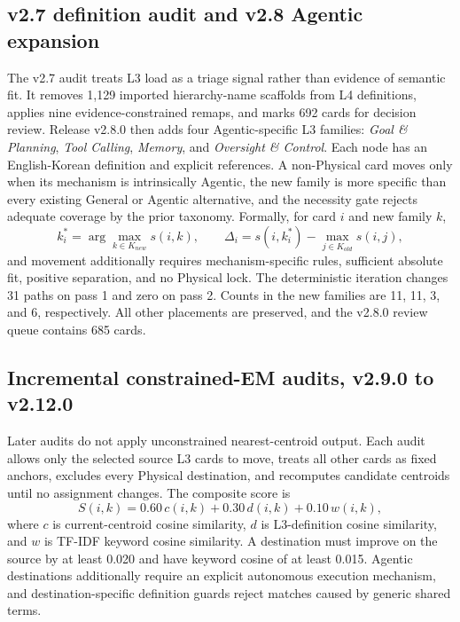 \documentclass[11pt,a4paper]{article}
\begin{document}
\subsection{v2.7 definition audit and v2.8 Agentic expansion}

The v2.7 audit treats L3 load as a triage signal rather than evidence of
semantic fit. It removes 1,129 imported hierarchy-name scaffolds from L4
definitions, applies nine evidence-constrained remaps, and marks 692 cards for
decision review. Release v2.8.0 then adds four Agentic-specific L3 families:
\textit{Goal \& Planning}, \textit{Tool Calling}, \textit{Memory}, and
\textit{Oversight \& Control}. Each node has an English-Korean definition and
explicit references. A non-Physical card moves only when its mechanism is
intrinsically Agentic, the new family is more specific than every existing
General or Agentic alternative, and the necessity gate rejects adequate
coverage by the prior taxonomy. Formally, for card $i$ and new family $k$,
\begin{equation}
 k_i^*=\arg\max_{k\in K_{new}} s(i,k),\qquad
 \Delta_i=s(i,k_i^*)-\max_{j\in K_{old}}s(i,j),
\end{equation}
and movement additionally requires mechanism-specific rules, sufficient
absolute fit, positive separation, and no Physical lock. The deterministic
iteration changes 31 paths on pass 1 and zero on pass 2. Counts in the new
families are 11, 11, 3, and 6, respectively. All other placements are
preserved, and the v2.8.0 review queue contains 685 cards.

\subsection{Incremental constrained-EM audits, v2.9.0 to v2.12.0}

Later audits do not apply unconstrained nearest-centroid output. Each audit
allows only the selected source L3 cards to move, treats all other cards as
fixed anchors, excludes every Physical destination, and recomputes candidate
centroids until no assignment changes. The composite score is
\begin{equation}
S(i,k)=0.60\,c(i,k)+0.30\,d(i,k)+0.10\,w(i,k),
\end{equation}
where $c$ is current-centroid cosine similarity, $d$ is L3-definition cosine
similarity, and $w$ is TF-IDF keyword cosine similarity. A destination must
improve on the source by at least 0.020 and have keyword cosine of at least
0.015. Agentic destinations additionally require an explicit autonomous
execution mechanism, and destination-specific definition guards reject
matches caused by generic shared terms.
\end{document}

